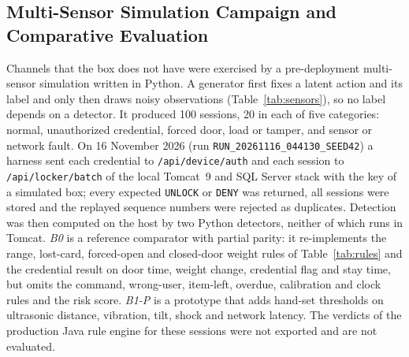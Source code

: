 \documentclass[journal,onecolumn]{IEEEtran}
\begin{document}
\subsection{Multi-Sensor Simulation Campaign and Comparative Evaluation}
\label{sec:sim_eval}

Channels that the box does not have were exercised by a pre-deployment multi-sensor simulation written in Python. A
generator first fixes a latent action and its label and only then draws noisy observations (Table~\ref{tab:sensors}),
so no label depends on a detector. It produced 100 sessions, 20 in each of five categories: normal, unauthorized
credential, forced door, load or tamper, and sensor or network fault. On 16 November 2026 (run
\texttt{RUN\_20261116\_044130\_SEED42}) a harness sent each credential to \texttt{/api/device/auth} and each session to
\texttt{/api/locker/batch} of the local Tomcat~9 and SQL Server stack with the key of a simulated box; every expected
\texttt{UNLOCK} or \texttt{DENY} was returned, all sessions were stored and the replayed sequence numbers were rejected
as duplicates. Detection was then computed on the host by two Python detectors, neither of which runs in Tomcat.
\emph{B0} is a reference comparator with partial parity: it re-implements the range, lost-card, forced-open and
closed-door weight rules of Table~\ref{tab:rules} and the credential result on door time, weight change, credential
flag and stay time, but omits the command, wrong-user, item-left, overdue, calibration and clock rules and the risk
score. \emph{B1-P} is a prototype that adds hand-set thresholds on ultrasonic distance, vibration, tilt, shock and
network latency. The verdicts of the production Java rule engine for these sessions were not exported and are not
evaluated.
\end{document}
